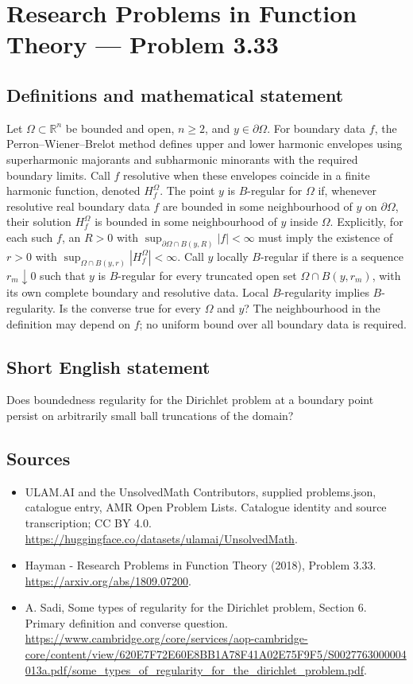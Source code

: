 \documentclass[11pt,a4paper]{article}
\begin{document}
\section*{Research Problems in Function Theory — Problem 3.33}\label{statement}

\subsection{Definitions and mathematical statement}
Let $\Omega\subset\mathbb R^n$ be bounded and open, $n\ge2$, and $y\in\partial\Omega$. For boundary data $f$, the Perron--Wiener--Brelot method defines upper and lower harmonic envelopes using superharmonic majorants and subharmonic minorants with the required boundary limits. Call $f$ resolutive when these envelopes coincide in a finite harmonic function, denoted $H_f^\Omega$.
The point $y$ is $B$-regular for $\Omega$ if, whenever resolutive real boundary data $f$ are bounded in some neighbourhood of $y$ on $\partial\Omega$, their solution $H_f^\Omega$ is bounded in some neighbourhood of $y$ inside $\Omega$. Explicitly, for each such $f$, an $R>0$ with
$\sup_{\partial\Omega\cap B(y,R)}|f|<\infty$ must imply the existence of $r>0$ with
$\sup_{\Omega\cap B(y,r)}|H_f^\Omega|<\infty$.
Call $y$ locally $B$-regular if there is a sequence $r_m\downarrow0$ such that $y$ is $B$-regular for every truncated open set $\Omega\cap B(y,r_m)$, with its own complete boundary and resolutive data.
Local $B$-regularity implies $B$-regularity. Is the converse true for every $\Omega$ and $y$? The neighbourhood in the definition may depend on $f$; no uniform bound over all boundary data is required.
\subsection{Short English statement}
Does boundedness regularity for the Dirichlet problem at a boundary point persist on arbitrarily small ball truncations of the domain?
\subsection{Sources}
\begin{itemize}
\item[S1] ULAM.AI and the UnsolvedMath Contributors, supplied problems.json, catalogue entry, AMR Open Problem Lists. Catalogue identity and source transcription; CC BY 4.0.
\url{https://huggingface.co/datasets/ulamai/UnsolvedMath}.
\item[S2] Hayman - Research Problems in Function Theory (2018), Problem 3.33. 
\url{https://arxiv.org/abs/1809.07200}.
\item[S3] A. Sadi, Some types of regularity for the Dirichlet problem, Section 6. Primary definition and converse question.
\url{https://www.cambridge.org/core/services/aop-cambridge-core/content/view/620E7F72E60E8BB1A78F41A02E75F9F5/S0027763000004013a.pdf/some_types_of_regularity_for_the_dirichlet_problem.pdf}.
\end{itemize}
\end{document}

